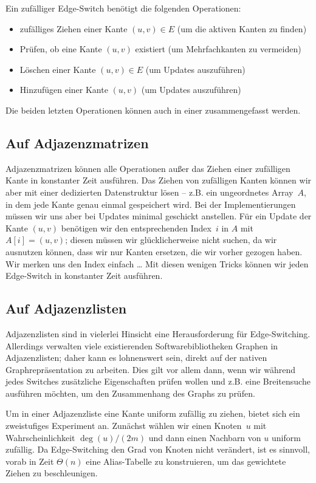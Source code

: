 Ein zufälliger Edge-Switch benötigt die folgenden Operationen:
\begin{itemize}
    \item zufälliges Ziehen einer Kante $(u,v) \in E$ (um die aktiven Kanten zu finden)
    \item Prüfen, ob eine Kante $(u, v)$ existiert (um Mehrfachkanten zu vermeiden)
    \item Löschen einer Kante $(u, v) \in E$ (um Updates auszuführen)
    \item Hinzufügen einer Kante $(u, v)$ (um Updates auszuführen)
\end{itemize}

Die beiden letzten Operationen können auch in einer zusammengefasst werden.

\subsection{Auf Adjazenzmatrizen}
Adjazenzmatrizen können alle Operationen außer das Ziehen einer zufälligen Kante in konstanter Zeit ausführen.
Das Ziehen von zufälligen Kanten können wir aber mit einer dedizierten Datenstruktur lösen --
z.B. ein ungeordnetes Array~$A$, in dem jede Kante genau einmal gespeichert wird.
Bei der Implementierungen müssen wir uns aber bei Updates minimal geschickt anstellen.
Für ein Update der Kante $(u,v)$ benötigen wir den entsprechenden Index~$i$ in $A$ mit $A[i] = (u,v)$;
diesen müssen wir glücklicherweise nicht suchen, da wir ausnutzen können, dass wir nur Kanten ersetzen, die wir vorher gezogen haben.
Wir merken uns den Index einfach \dots{}
Mit diesen wenigen Tricks können wir jeden Edge-Switch in konstanter Zeit ausführen.

\subsection{Auf Adjazenzlisten}
Adjazenzlisten sind in vielerlei Hinsicht eine Herausforderung für Edge-Switching.
Allerdings verwalten viele existierenden Softwarebibliotheken Graphen in Adjazenzlisten; daher kann es lohnenswert sein, direkt auf der nativen Graphrepräsentation zu arbeiten.
Dies gilt vor allem dann, wenn wir während jedes Switches zusätzliche Eigenschaften prüfen wollen und z.B. eine Breitensuche ausführen möchten, um den Zusammenhang des Graphs zu prüfen.

Um in einer Adjazenzliste eine Kante uniform zufällig zu ziehen, bietet sich ein zweistufiges Experiment an.
Zunächst wählen wir einen Knoten~$u$ mit Wahrscheinlichkeit $\deg(u) / (2m)$ und dann einen Nachbarn von $u$ uniform zufällig.
Da Edge-Switching den Grad von Knoten nicht verändert, ist es sinnvoll, vorab in Zeit $\Theta(n)$ eine Alias-Tabelle zu konstruieren, um das gewichtete Ziehen zu beschleunigen.

